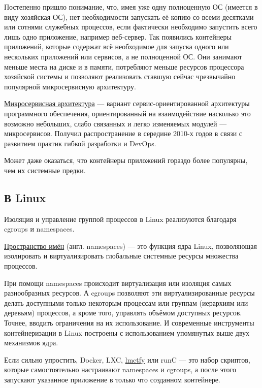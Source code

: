 \documentclass[14pt, a4paper]{article}
\begin{document}
Постепенно пришло понимание, что, имея уже одну полноценную ОС (имеется в виду хозяйская ОС),
нет необходимости запускать её копию со всеми десятками или сотнями служебных процессов, если
фактически необходимо запустить всего лишь одно приложение, например веб-сервер. Так появились
контейнеры приложений, которые содержат всё необходимое для запуска одного или нескольких
приложений или сервисов, а не полноценной ОС. Они занимают меньше места на диске и в памяти,
потребляют меньше ресурсов процессора хозяйской системы и позволяют реализовать ставшую
сейчас чрезвычайно популярной микросервисную архитектуру.

\href{https://ru.wikipedia.org/wiki/Ìèêðîñåðâèñíàÿ_àðõèòåêòóðà}{Микросервисная архитектура} — вариант сервис-ориентированной архитектуры программного
обеспечения, ориентированный на взаимодействие насколько это возможно небольших, слабо
связанных и легко изменяемых модулей — микросервисов. Получил распространение в середине
2010-х годов в связи с развитием практик гибкой разработки и DevOps.

Может даже оказаться, что контейнеры приложений гораздо более популярны, чем их системные
предки.\\


\subsection*{В Linux}

Изоляция и управление группой процессов в Linux реализуются благодаря cgroups и namespaces.

\href{https://ru.wikipedia.org/wiki/Ïðîñòðàíñòâî_èì¸í_(Linux)}{Пространство имён} (англ. namespaces) — это функция ядра Linux, позволяющая изолировать и
виртуализировать глобальные системные ресурсы множества процессов.

При помощи namespaces происходит виртуализация или изоляция самых разнообразных ресурсов. А
cgroups позволяют эти виртуализированные ресурсы делать доступными только некоторым
процессам или группам (иерархиям или деревьям) процессов, а кроме того, управлять объёмом
доступных ресурсов. Точнее, вводить ограничения на их использование. И современные инструменты
контейнеризации в Linux построены с использованием упомянутых выше двух механизмов ядра.

Если сильно упростить, Docker, LXC, \href{https://en.wikipedia.org/wiki/Lmctfy}{lmctfy} или runC — это набор скриптов, которые самостоятельно
настраивают namespaces и cgroups, а после этого запускают указанное приложение в только что
созданном контейнере.
\end{document}
